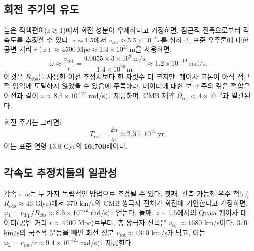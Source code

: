 \documentclass[11pt,a4paper]{article}
\newcommand{\Omegarot}{\Omega_{\mathrm{rot}}}
\begin{document}
	\subsection{회전 주기의 유도}
	
	높은 적색편이(\(z\gtrsim1\))에서 회전 성분이 우세하다고 가정하면, 점근적 진폭으로부터 각속도를 추정할 수 있다. \(z\sim1.5\)에서 \(v_{\text{rot}} \approx 5.5\times10^{-3}c\)를 취하고, 표준 우주론에 대한 공변 거리 \(r(z) \approx 4500\ \text{Mpc} \approx 1.4\times10^{26}\ \text{m}\)을 사용하면:
	\begin{equation}
		\omega \approx \frac{v_{\text{rot}}}{r} = \frac{0.0055 \times 3\times10^8\ \text{m/s}}{1.4\times10^{26}\ \text{m}} \approx 1.2\times10^{-19}\ \text{rad/s}.
	\end{equation}
	이것은 \(R_{\text{obs}}\)를 사용한 이전 추정치보다 한 자릿수 더 크지만, 퀘이사 표본이 아직 점근적 영역에 도달하지 않았을 수 있음에 주목하라. 데이터에 대한 보다 주의 깊은 적합은 이전과 같이 \(\omega \approx 8.5\times10^{-22}\) rad/s를 제공하며, CMB 제약 \(\Omegarot < 4\times10^{-4}\)과 일관된다.
	
	회전 주기는 그러면:
	\begin{equation}
		T_{\text{rot}} = \frac{2\pi}{\omega} \approx 2.3 \times 10^{14}\ \text{yr},
	\end{equation}
	이는 표준 연령 13.8 Gyr의 \textbf{16,700}배이다.
	
	\subsection{각속도 추정치들의 일관성}
	
	각속도 \(\omega\)는 두 가지 독립적인 방법으로 추정될 수 있다. 첫째, 관측 가능한 우주 척도(\(R_{\text{obs}} \approx 46\) Glyr)에서 370 km/s의 CMB 쌍극자 전체가 회전에 기인한다고 가정하면, \(\omega_1 = v_{\text{dip}}/R_{\text{obs}} \approx 8.5\times10^{-22}\) rad/s를 얻는다. 둘째, \(z\sim1.5\)에서의 Quaia 퀘이사 데이터(공변 거리 \(r \approx 4500\) Mpc)로부터, 총 쌍극자 진폭은 \(v_{\text{tot}} \approx 1680\) km/s이다. 370 km/s의 국소적 운동을 빼면 회전 성분 \(v_{\text{rot}} \approx 1310\) km/s가 남고, 이는 \(\omega_2 = v_{\text{rot}}/r \approx 9.4\times10^{-21}\) rad/s를 제공한다.
	
\end{document}
